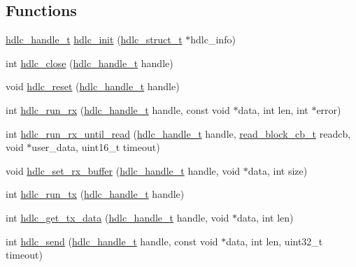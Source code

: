 \subsection*{Functions}
\begin{DoxyCompactItemize}
\item 
\hyperlink{group__HDLC__API_gabeaf7578aed5279d3af891bd85a9f961}{hdlc\+\_\+handle\+\_\+t} \hyperlink{group__HDLC__API_gaa41c388433273a76460ddfbaff0f8f5d}{hdlc\+\_\+init} (\hyperlink{group__HDLC__API_ga4537a8665b2abe023cb7fe40ea1bd024}{hdlc\+\_\+struct\+\_\+t} $\ast$hdlc\+\_\+info)
\item 
int \hyperlink{group__HDLC__API_ga21d727583f0f4534c8e4688eafcec66f}{hdlc\+\_\+close} (\hyperlink{group__HDLC__API_gabeaf7578aed5279d3af891bd85a9f961}{hdlc\+\_\+handle\+\_\+t} handle)
\item 
void \hyperlink{group__HDLC__API_ga532836280097de1c8881df8336f21075}{hdlc\+\_\+reset} (\hyperlink{group__HDLC__API_gabeaf7578aed5279d3af891bd85a9f961}{hdlc\+\_\+handle\+\_\+t} handle)
\item 
int \hyperlink{group__HDLC__API_ga911a3f1cb32dd6cadd00223e0097642c}{hdlc\+\_\+run\+\_\+rx} (\hyperlink{group__HDLC__API_gabeaf7578aed5279d3af891bd85a9f961}{hdlc\+\_\+handle\+\_\+t} handle, const void $\ast$data, int len, int $\ast$error)
\item 
int \hyperlink{group__HDLC__API_gaf20d86bb10361096f507838394c624c7}{hdlc\+\_\+run\+\_\+rx\+\_\+until\+\_\+read} (\hyperlink{group__HDLC__API_gabeaf7578aed5279d3af891bd85a9f961}{hdlc\+\_\+handle\+\_\+t} handle, \hyperlink{tiny__types_8h_a15bec127d9ee63658563d62e92b5261b}{read\+\_\+block\+\_\+cb\+\_\+t} readcb, void $\ast$user\+\_\+data, uint16\+\_\+t timeout)
\item 
void \hyperlink{group__HDLC__API_ga73156f5cc3e59c3abb880d124de78f91}{hdlc\+\_\+set\+\_\+rx\+\_\+buffer} (\hyperlink{group__HDLC__API_gabeaf7578aed5279d3af891bd85a9f961}{hdlc\+\_\+handle\+\_\+t} handle, void $\ast$data, int size)
\item 
int \hyperlink{group__HDLC__API_gae31d921043b4f175603114c206b6b829}{hdlc\+\_\+run\+\_\+tx} (\hyperlink{group__HDLC__API_gabeaf7578aed5279d3af891bd85a9f961}{hdlc\+\_\+handle\+\_\+t} handle)
\item 
int \hyperlink{group__HDLC__API_gaaeece06ea6894a19402f76158e1d101d}{hdlc\+\_\+get\+\_\+tx\+\_\+data} (\hyperlink{group__HDLC__API_gabeaf7578aed5279d3af891bd85a9f961}{hdlc\+\_\+handle\+\_\+t} handle, void $\ast$data, int len)
\item 
int \hyperlink{group__HDLC__API_ga8b5cc456927145cebd82b2b560a6fa10}{hdlc\+\_\+send} (\hyperlink{group__HDLC__API_gabeaf7578aed5279d3af891bd85a9f961}{hdlc\+\_\+handle\+\_\+t} handle, const void $\ast$data, int len, uint32\+\_\+t timeout)
\end{DoxyCompactItemize}


